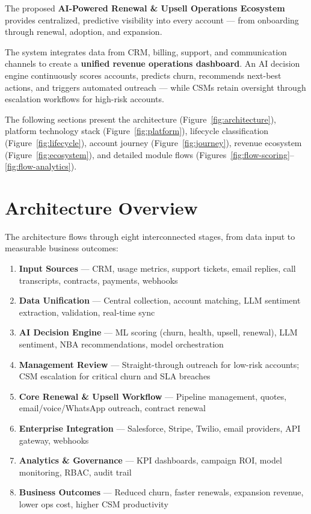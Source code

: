 \documentclass[11pt,a4paper]{article}
\begin{document}
The proposed \textbf{AI-Powered Renewal \& Upsell Operations Ecosystem} provides centralized, predictive visibility into every account --- from onboarding through renewal, adoption, and expansion.

The system integrates data from CRM, billing, support, and communication channels to create a \textbf{unified revenue operations dashboard}. An AI decision engine continuously scores accounts, predicts churn, recommends next-best actions, and triggers automated outreach --- while CSMs retain oversight through escalation workflows for high-risk accounts.

The following sections present the architecture (Figure~\ref{fig:architecture}), platform technology stack (Figure~\ref{fig:platform}), lifecycle classification (Figure~\ref{fig:lifecycle}), account journey (Figure~\ref{fig:journey}), revenue ecosystem (Figure~\ref{fig:ecosystem}), and detailed module flows (Figures~\ref{fig:flow-scoring}--\ref{fig:flow-analytics}).

\section{Architecture Overview}

The architecture flows through eight interconnected stages, from data input to measurable business outcomes:

\begin{enumerate}[leftmargin=1.5em, itemsep=0.4em]
    \item \textbf{Input Sources} --- CRM, usage metrics, support tickets, email replies, call transcripts, contracts, payments, webhooks
    \item \textbf{Data Unification} --- Central collection, account matching, LLM sentiment extraction, validation, real-time sync
    \item \textbf{AI Decision Engine} --- ML scoring (churn, health, upsell, renewal), LLM sentiment, NBA recommendations, model orchestration
    \item \textbf{Management Review} --- Straight-through outreach for low-risk accounts; CSM escalation for critical churn and SLA breaches
    \item \textbf{Core Renewal \& Upsell Workflow} --- Pipeline management, quotes, email/voice/WhatsApp outreach, contract renewal
    \item \textbf{Enterprise Integration} --- Salesforce, Stripe, Twilio, email providers, API gateway, webhooks
    \item \textbf{Analytics \& Governance} --- KPI dashboards, campaign ROI, model monitoring, RBAC, audit trail
    \item \textbf{Business Outcomes} --- Reduced churn, faster renewals, expansion revenue, lower ops cost, higher CSM productivity
\end{enumerate}
\end{document}
